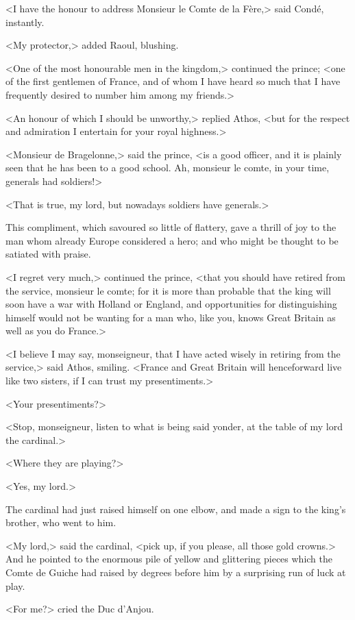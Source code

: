 <I have the honour to address Monsieur le Comte de la Fère,> said Condé, instantly.

<My protector,> added Raoul, blushing.

<One of the most honourable men in the kingdom,> continued the prince; <one of the first gentlemen of France, and of whom I have heard so much that I have frequently desired to number him among my friends.>

<An honour of which I should be unworthy,> replied Athos, <but for the respect and admiration I entertain for your royal highness.>

<Monsieur de Bragelonne,> said the prince, <is a good officer, and it is plainly seen that he has been to a good school. Ah, monsieur le comte, in your time, generals had soldiers!>

<That is true, my lord, but nowadays soldiers have generals.>

This compliment, which savoured so little of flattery, gave a thrill of joy to the man whom already Europe considered a hero; and who might be thought to be satiated with praise.

<I regret very much,> continued the prince, <that you should have retired from the service, monsieur le comte; for it is more than probable that the king will soon have a war with Holland or England, and opportunities for distinguishing himself would not be wanting for a man who, like you, knows Great Britain as well as you do France.>

<I believe I may say, monseigneur, that I have acted wisely in retiring from the service,> said Athos, smiling. <France and Great Britain will henceforward live like two sisters, if I can trust my presentiments.>

<Your presentiments?>

<Stop, monseigneur, listen to what is being said yonder, at the table of my lord the cardinal.>

<Where they are playing?>

<Yes, my lord.>

The cardinal had just raised himself on one elbow, and made a sign to the king's brother, who went to him.

<My lord,> said the cardinal, <pick up, if you please, all those gold crowns.> And he pointed to the enormous pile of yellow and glittering pieces which the Comte de Guiche had raised by degrees before him by a surprising run of luck at play.

<For me?> cried the Duc d'Anjou.

